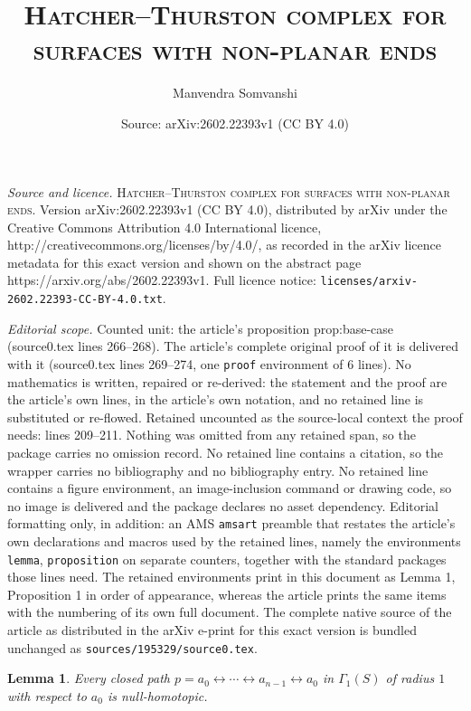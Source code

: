 \documentclass[10pt,a4paper]{amsart}
\title{\large\textsc{Hatcher--Thurston complex for surfaces with non-planar ends}}
\author{Manvendra Somvanshi}
\date{Source: arXiv:2602.22393v1 (CC BY 4.0)}
\newtheorem{lemma}{Lemma}
\def\lr{\leftrightarrow}
\begin{document}
\maketitle

\noindent\emph{Source and licence.} \large\textsc{Hatcher--Thurston complex for surfaces with non-planar ends}. Version arXiv:2602.22393v1 (CC BY 4.0), distributed by arXiv under the Creative Commons Attribution 4.0 International licence, http://creativecommons.org/licenses/by/4.0/, as recorded in the arXiv licence metadata for this exact version and shown on the abstract page https://arxiv.org/abs/2602.22393v1. Full licence notice: \texttt{licenses/arxiv-2602.22393-CC-BY-4.0.txt}.\par\smallskip

\noindent\textit{Editorial scope.} Counted unit: the article's proposition prop:base-case (source0.tex lines 266--268). The article's complete original proof of it is delivered with it (source0.tex lines 269--274, one \texttt{proof} environment of 6 lines). No mathematics is written, repaired or re-derived: the statement and the proof are the article's own lines, in the article's own notation, and no retained line is substituted or re-flowed.  Retained uncounted as the source-local context the proof needs: lines 209--211.  Nothing was omitted from any retained span, so the package carries no omission record.  No retained line contains a citation, so the wrapper carries no bibliography and no bibliography entry.  No retained line contains a figure environment, an image-inclusion command or drawing code, so no image is delivered and the package declares no asset dependency.  Editorial formatting only, in addition: an AMS \texttt{amsart} preamble that restates the article's own declarations and macros used by the retained lines, namely the environments \texttt{lemma}, \texttt{proposition} on separate counters, together with the standard packages those lines need.  The retained environments print in this document as Lemma 1, Proposition 1 in order of appearance, whereas the article prints the same items with the numbering of its own full document.  The complete native source of the article as distributed in the arXiv e-print for this exact version is bundled unchanged as \texttt{sources/195329/source0.tex}.
\begin{lemma}\label{lem:radius-1}
  Every closed path $p=a_0\lr \cdots \lr a_{n-1} \lr a_0$ in $\Gamma_1(S)$ of radius $1$ with respect to $a_0$ is null-homotopic. 
\end{lemma}
\end{document}

